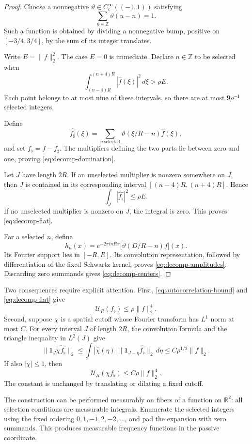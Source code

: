 \documentclass[11pt,a4paper]{article}
\newcommand{\R}{\mathbb R}
\newcommand{\Z}{\mathbb Z}
\newcommand{\ind}{\mathbf 1}
\begin{document}
\begin{proof}
Choose a nonnegative $\vartheta\in C_c^\infty((-1,1))$ satisfying
\[
\sum_{n\in\Z}\vartheta(u-n)=1.
\]
Such a function is obtained by dividing a nonnegative bump, positive on
$[-3/4,3/4]$, by the sum of its integer translates.

Write $E=\|f\|_2^2$. The case $E=0$ is immediate. Declare $n\in\Z$ to be
selected when
\[
\int_{(n-4)R}^{(n+4)R}|\widehat f(\xi)|^2\,d\xi>\rho E.
\]
Each point belongs to at most nine of these intervals, so there are at most
$9\rho^{-1}$ selected integers.

Define
\[
\widehat{f_\sharp}(\xi)
=\sum_{n\ \mathrm{selected}}
\vartheta(\xi/R-n)\widehat f(\xi),
\]
and set $f_\flat=f-f_\sharp$. The multipliers defining the two parts lie
between zero and one, proving \eqref{eq:decomp-domination}.

Let $J$ have length $2R$. If an unselected multiplier is nonzero somewhere
on $J$, then $J$ is contained in its corresponding interval
$[(n-4)R,(n+4)R]$. Hence
\[
\int_J|\widehat{f_\flat}|^2\leq\rho E.
\]
If no unselected multiplier is nonzero on $J$, the integral is zero. This
proves \eqref{eq:decomp-flat}.

For a selected $n$, define
\[
h_n(x)=e^{-2\pi i nRx}\bigl[\vartheta(D/R-n)f\bigr](x).
\]
Its Fourier support lies in $[-R,R]$. Its convolution representation,
followed by differentiation of the fixed Schwartz kernel, proves
\eqref{eq:decomp-amplitudes}. Discarding zero summands gives
\eqref{eq:decomp-centers}.
\end{proof}

Two consequences require explicit attention. First,
\eqref{eq:autocorrelation-bound} and \eqref{eq:decomp-flat} give
\[
\mathcal U_R(f_\flat)\leq\rho\|f\|_2^4.
\tag{2.6}\label{eq:flat-correlation}
\]
Second, suppose $\chi$ is a spatial cutoff whose Fourier transform has
$L^1$ norm at most $C$. For every interval $J$ of length $2R$, the
convolution formula and the triangle inequality in $L^2(J)$ give
\[
\|\ind_J\widehat{\chi f_\flat}\|_2
\leq\int |\widehat\chi(\eta)|
\|\ind_{J-\eta}\widehat{f_\flat}\|_2\,d\eta
\leq C\rho^{1/2}\|f\|_2.
\]
If also $|\chi|\leq1$, then
\[
\mathcal U_R(\chi f_\flat)\leq C\rho\|f\|_2^4.
\tag{2.7}\label{eq:localized-flat-correlation}
\]
The constant is unchanged by translating or dilating a fixed cutoff.

The construction can be performed measurably on fibers of a function on
$\R^2$: all selection conditions are measurable integrals. Enumerate the
selected integers using the fixed ordering $0,1,-1,2,-2,\ldots$, and pad
the expansion with zero summands. This produces measurable frequency
functions in the passive coordinate.
\end{document}
